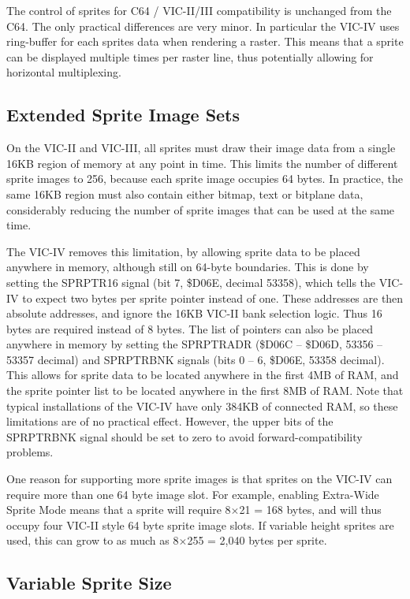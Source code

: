 The control of sprites for C64 / VIC-II/III compatibility is unchanged from the C64.  The only practical differences are very minor.
In particular the VIC-IV uses ring-buffer for each sprites data when rendering a raster. This means that a sprite can be displayed multiple times per raster line, thus potentially allowing for horizontal multiplexing.

\subsection{Extended Sprite Image Sets}

On the VIC-II and VIC-III, all sprites must draw their image data from a single 16KB region of memory at any point in time.
This limits the number of different sprite images to 256, because each sprite image occupies 64 bytes.  In practice, the same
16KB region must also contain either bitmap, text or bitplane data, considerably reducing the number of sprite images that
can be used at the same time.

The VIC-IV removes this limitation, by allowing sprite data to be placed anywhere in memory, although still on 64-byte
boundaries. This is done by setting the SPRPTR16 signal (bit 7, \$D06E, decimal 53358), which tells the VIC-IV to expect
two bytes per sprite pointer instead of one.  These addresses are then absolute addresses, and ignore the 16KB VIC-II
bank selection logic.  Thus 16 bytes are required instead of 8 bytes.  The list of pointers can also be placed anywhere
in memory by setting the SPRPTRADR (\$D06C -- \$D06D, 53356 -- 53357 decimal) and SPRPTRBNK signals (bits 0 -- 6, \$D06E, 53358 decimal).
This allows for sprite data to be located anywhere in the first 4MB of RAM, and the sprite pointer list to be located anywhere
in the first 8MB of RAM.  Note that typical installations of the VIC-IV have only 384KB of connected RAM, so these limitations are
of no practical effect. However, the upper bits of the SPRPTRBNK signal should be set to zero to avoid forward-compatibility
problems.

One reason for supporting more sprite images is that sprites on the VIC-IV can require more than one 64 byte image slot.
For example, enabling Extra-Wide Sprite Mode means that a sprite will require 8$\times$21 = 168 bytes, and will thus occupy
four VIC-II style 64 byte sprite image slots.  If variable height sprites are used, this can grow to as much as  8$\times$255 = 2,040 bytes per sprite.

\subsection{Variable Sprite Size}

